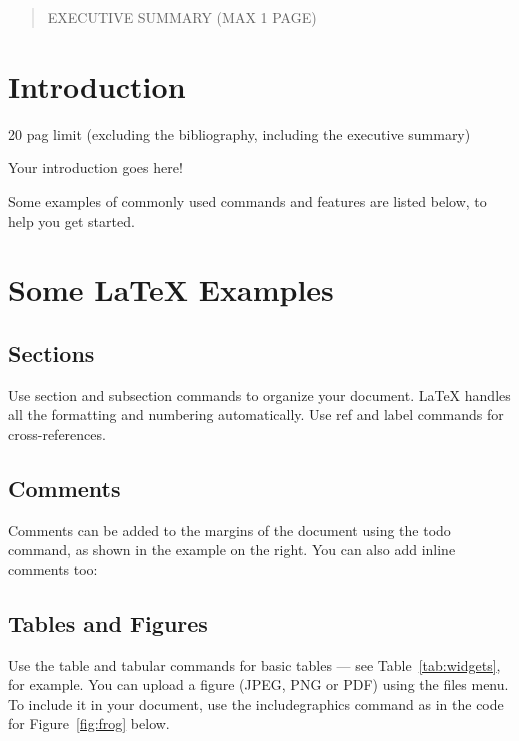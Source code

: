 \newpage
\pagecolor{white}
\rmfamily
\setcounter{page}{1}

\begin{abstract}
EXECUTIVE SUMMARY (MAX 1 PAGE)
\end{abstract}

\section{Introduction}
\newcommand{\Deriv}[3]{\dfrac{\partial^#1 #2}{\partial #3^#1}}

20 pag limit (excluding the bibliography, including the executive summary)

Your introduction goes here! 

Some examples of commonly used commands and features are listed below, to help you get started.


\section{Some \LaTeX{} Examples}
\label{sec:examples}

\subsection{Sections}

Use section and subsection commands to organize your document. \LaTeX{} handles all the formatting and numbering automatically. Use ref and label commands for cross-references.

\subsection{Comments}

Comments can be added to the margins of the document using the  todo command, as shown in the example on the right. You can also add inline comments too:


\subsection{Tables and Figures}

Use the table and tabular commands for basic tables --- see Table~\ref{tab:widgets}, for example. You can upload a figure (JPEG, PNG or PDF) using the files menu. To include it in your document, use the includegraphics command as in the code for Figure~\ref{fig:frog} below.

